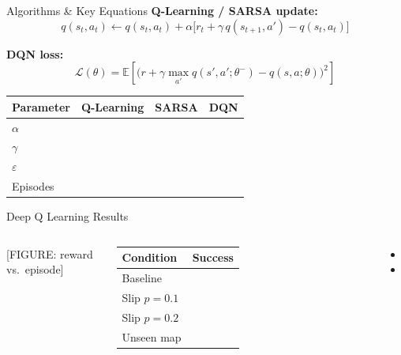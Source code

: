 \documentclass[aspectratio=169]{beamer}
\newcommand{\actionval}{\ensuremath{q}}
\newcommand{\discount}{\ensuremath{\gamma}}
\begin{document}
\begin{frame}{Algorithms \& Key Equations}
  \textbf{Q-Learning / SARSA update:}
  \[
    \actionval(s_t,a_t) \leftarrow \actionval(s_t,a_t)
    + \alpha\bigl[r_t + \discount\, \actionval(s_{t+1},a') - \actionval(s_t,a_t)\bigr]
  \]

  \textbf{DQN loss:}
  \[
    \mathcal{L}(\theta) = \mathbb{E}\!\left[
      \bigl(r + \discount\max_{a'}\actionval(s',a';\theta^{-})
      - \actionval(s,a;\theta)\bigr)^2\right]
  \]

  \begin{table}
    \centering
    \small
    \begin{tabular}{lccc}
      \toprule
      Parameter & Q-Learning & SARSA & DQN \\
      \midrule
      $\alpha$          & & & \\
      $\discount$       & & & \\
      $\varepsilon$     & & & \\
      Episodes          & & & \\
      \bottomrule
    \end{tabular}
  \end{table}
\end{frame}

\begin{frame}{Deep Q Learning Results}
  \begin{columns}
      [FIGURE: reward vs.\ episode]
      \begin{table}
        \centering
        \small
        \begin{tabular}{lc}
          \toprule
          Condition & Success \\
          \midrule
          Baseline      & \\
          Slip $p=0.1$  & \\
          Slip $p=0.2$  & \\
          Unseen map    & \\
          \bottomrule
        \end{tabular}
      \end{table}
      \begin{itemize}
        \item %
        \item %
      \end{itemize}
  \end{columns}
\end{frame}
\end{document}

